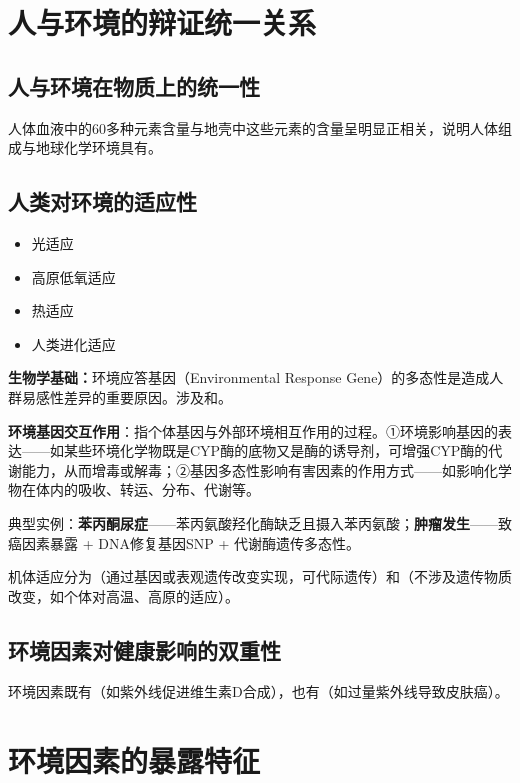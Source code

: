 \section{人与环境的辩证统一关系}

\subsection{人与环境在物质上的统一性}
人体血液中的60多种元素含量与地壳中这些元素的含量呈明显正相关，说明人体组成与地球化学环境具有。

\subsection{人类对环境的适应性}
\begin{itemize}[leftmargin=*]
    \item 光适应
    \item 高原低氧适应
    \item 热适应
    \item 人类进化适应
\end{itemize}

\textbf{生物学基础：}环境应答基因（Environmental Response Gene）的多态性是造成人群易感性差异的重要原因。涉及和。

\begin{defbox}
\textbf{环境基因交互作用}：指个体基因与外部环境相互作用的过程。①环境影响基因的表达——如某些环境化学物既是CYP酶的底物又是酶的诱导剂，可增强CYP酶的代谢能力，从而增毒或解毒；②基因多态性影响有害因素的作用方式——如影响化学物在体内的吸收、转运、分布、代谢等。

典型实例：\textbf{苯丙酮尿症}——苯丙氨酸羟化酶缺乏且摄入苯丙氨酸；\textbf{肿瘤发生}——致癌因素暴露 + DNA修复基因SNP + 代谢酶遗传多态性。

机体适应分为（通过基因或表观遗传改变实现，可代际遗传）和（不涉及遗传物质改变，如个体对高温、高原的适应）。
\end{defbox}

\subsection{环境因素对健康影响的双重性}
环境因素既有（如紫外线促进维生素D合成），也有（如过量紫外线导致皮肤癌）。

\section{环境因素的暴露特征}

